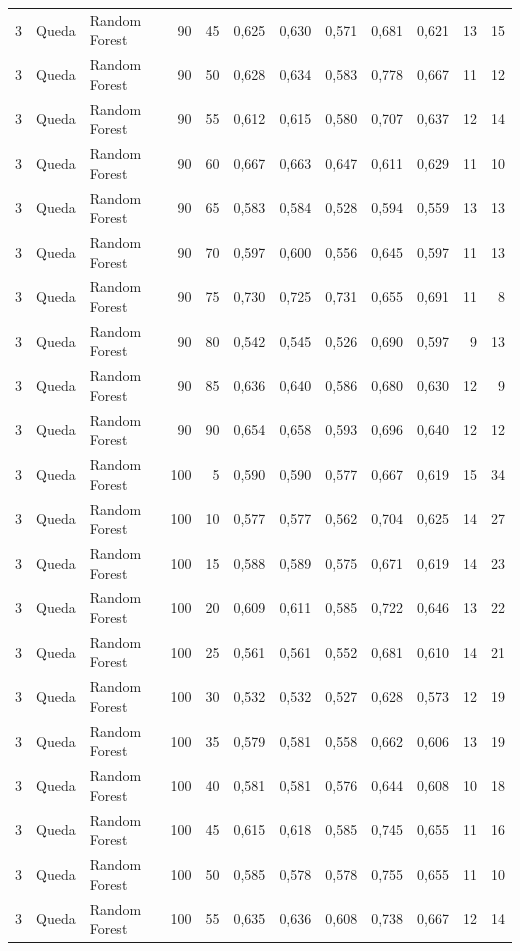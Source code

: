 \begin{longtable}{@{}rllrrrrrrrrr@{}}
3 & Queda & Random Forest & 90 & 45 & 0,625 & 0,630 & 0,571 & 0,681 & 0,621 & 13 & 15 \\
3 & Queda & Random Forest & 90 & 50 & 0,628 & 0,634 & 0,583 & 0,778 & 0,667 & 11 & 12 \\
3 & Queda & Random Forest & 90 & 55 & 0,612 & 0,615 & 0,580 & 0,707 & 0,637 & 12 & 14 \\
3 & Queda & Random Forest & 90 & 60 & 0,667 & 0,663 & 0,647 & 0,611 & 0,629 & 11 & 10 \\
3 & Queda & Random Forest & 90 & 65 & 0,583 & 0,584 & 0,528 & 0,594 & 0,559 & 13 & 13 \\
3 & Queda & Random Forest & 90 & 70 & 0,597 & 0,600 & 0,556 & 0,645 & 0,597 & 11 & 13 \\
3 & Queda & Random Forest & 90 & 75 & 0,730 & 0,725 & 0,731 & 0,655 & 0,691 & 11 & 8 \\
3 & Queda & Random Forest & 90 & 80 & 0,542 & 0,545 & 0,526 & 0,690 & 0,597 & 9 & 13 \\
3 & Queda & Random Forest & 90 & 85 & 0,636 & 0,640 & 0,586 & 0,680 & 0,630 & 12 & 9 \\
3 & Queda & Random Forest & 90 & 90 & 0,654 & 0,658 & 0,593 & 0,696 & 0,640 & 12 & 12 \\
3 & Queda & Random Forest & 100 & 5 & 0,590 & 0,590 & 0,577 & 0,667 & 0,619 & 15 & 34 \\
3 & Queda & Random Forest & 100 & 10 & 0,577 & 0,577 & 0,562 & 0,704 & 0,625 & 14 & 27 \\
3 & Queda & Random Forest & 100 & 15 & 0,588 & 0,589 & 0,575 & 0,671 & 0,619 & 14 & 23 \\
3 & Queda & Random Forest & 100 & 20 & 0,609 & 0,611 & 0,585 & 0,722 & 0,646 & 13 & 22 \\
3 & Queda & Random Forest & 100 & 25 & 0,561 & 0,561 & 0,552 & 0,681 & 0,610 & 14 & 21 \\
3 & Queda & Random Forest & 100 & 30 & 0,532 & 0,532 & 0,527 & 0,628 & 0,573 & 12 & 19 \\
3 & Queda & Random Forest & 100 & 35 & 0,579 & 0,581 & 0,558 & 0,662 & 0,606 & 13 & 19 \\
3 & Queda & Random Forest & 100 & 40 & 0,581 & 0,581 & 0,576 & 0,644 & 0,608 & 10 & 18 \\
3 & Queda & Random Forest & 100 & 45 & 0,615 & 0,618 & 0,585 & 0,745 & 0,655 & 11 & 16 \\
3 & Queda & Random Forest & 100 & 50 & 0,585 & 0,578 & 0,578 & 0,755 & 0,655 & 11 & 10 \\
3 & Queda & Random Forest & 100 & 55 & 0,635 & 0,636 & 0,608 & 0,738 & 0,667 & 12 & 14 \\

\end{longtable}
